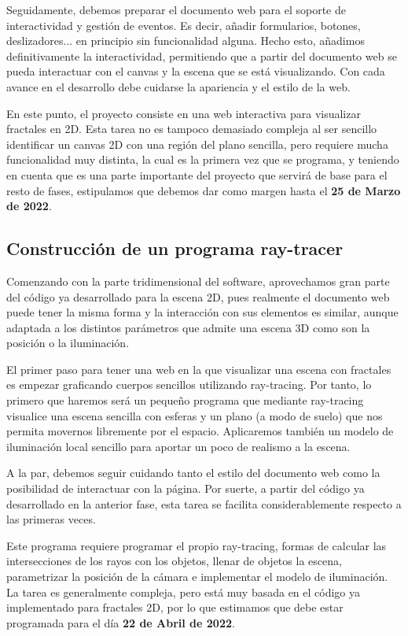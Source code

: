 Seguidamente, debemos preparar el documento web para el soporte de interactividad y gestión de eventos. Es decir, añadir formularios, botones, deslizadores... en principio sin funcionalidad alguna. Hecho esto, añadimos definitivamente la interactividad, permitiendo que a partir del documento web se pueda interactuar con el canvas y la escena que se está visualizando. Con cada avance en el desarrollo debe cuidarse la apariencia y el estilo de la web.

En este punto, el proyecto consiste en una web interactiva para visualizar fractales en 2D. Esta tarea no es tampoco demasiado compleja al ser sencillo identificar un canvas 2D con una región del plano sencilla, pero requiere mucha funcionalidad muy distinta, la cual es la primera vez que se programa, y teniendo en cuenta que es una parte importante del proyecto que servirá de base para el resto de fases, estipulamos que debemos dar como margen hasta el \textbf{25 de Marzo de 2022}.

\subsection*{Construcción de un programa ray-tracer}

Comenzando con la parte tridimensional del software, aprovechamos gran parte del código ya desarrollado para la escena 2D, pues realmente el documento web puede tener la misma forma y la interacción con sus elementos es similar, aunque adaptada a los distintos parámetros que admite una escena 3D como son la posición o la iluminación.

El primer paso para tener una web en la que visualizar una escena con fractales es empezar graficando cuerpos sencillos utilizando ray-tracing. Por tanto, lo primero que haremos será un pequeño programa que mediante ray-tracing visualice una escena sencilla con esferas y un plano (a modo de suelo) que nos permita movernos libremente por el espacio. Aplicaremos también un modelo de iluminación local sencillo para aportar un poco de realismo a la escena.

A la par, debemos seguir cuidando tanto el estilo del documento web como la posibilidad de interactuar con la página. Por suerte, a partir del código ya desarrollado en la anterior fase, esta tarea se facilita considerablemente respecto a las primeras veces.

Este programa requiere programar el propio ray-tracing, formas de calcular las intersecciones de los rayos con los objetos, llenar de objetos la escena, parametrizar la posición de la cámara e implementar el modelo de iluminación. La tarea es generalmente compleja, pero está muy basada en el código ya implementado para fractales 2D, por lo que estimamos que debe estar programada para el día \textbf{22 de Abril de 2022}.

